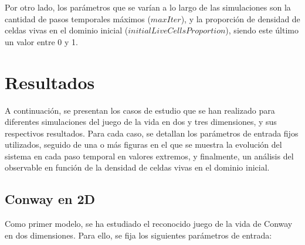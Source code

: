 \documentclass[11pt]{article}
\begin{document}
    Por otro lado, los parámetros que se varían a lo largo de las simulaciones son la cantidad de pasos temporales
    máximos ($maxIter$), y la proporción de densidad de celdas vivas en el dominio inicial ($initialLiveCellsProportion$),
    siendo este último un valor entre 0 y 1.


    \section{Resultados}\label{sec:resultados}
    A continuación, se presentan los casos de estudio que se han realizado para diferentes simulaciones del juego
    de la vida en dos y tres dimensiones, y sus respectivos resultados.
    Para cada caso, se detallan los parámetros de entrada fijos utilizados, seguido de una o más figuras en el que
    se muestra la evolución del sistema en cada paso temporal en valores extremos, y finalmente, un análisis del
    observable en función de la densidad de celdas vivas en el dominio inicial.

    \subsection{Conway en 2D}\label{subsec:conway-en-2d}

    Como primer modelo, se ha estudiado el reconocido juego de la vida de Conway en dos dimensiones.
    Para ello, se fija los siguientes parámetros de entrada:
\end{document}
